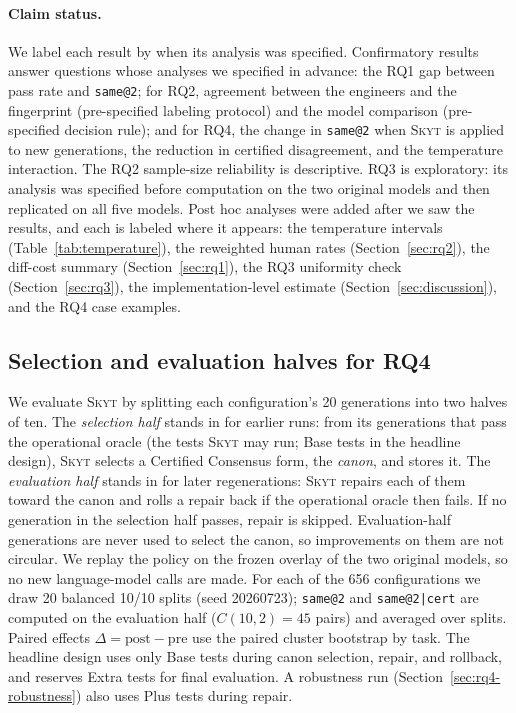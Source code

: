 \documentclass[acmsmall,screen,review,anonymous]{acmart}
\makeatletter
\newcommand{\skyt}{\textsc{Skyt}}
\newcommand{\sameat}{\mbox{\texttt{same@2}}}
\newcommand{\sameatc}{\mbox{\texttt{same@2|cert}}}
\makeatother
\begin{document}
\paragraph{Claim status.}
We label each result by when its analysis was specified.
Confirmatory results answer questions whose analyses we specified in advance:
the RQ1 gap between pass rate and \sameat{};
for RQ2, agreement between the engineers and the fingerprint (pre-specified
labeling protocol) and the model comparison (pre-specified decision rule);
and for RQ4, the change in \sameat{} when \skyt{} is applied to new
generations, the reduction in certified disagreement, and the
temperature interaction.
The RQ2 sample-size reliability is descriptive.
RQ3 is exploratory: its analysis was specified before computation on the
two original models and then replicated on all five models.
Post hoc analyses were added after we saw the results, and each is labeled
where it appears: the temperature intervals (Table~\ref{tab:temperature}),
the reweighted human rates (Section~\ref{sec:rq2}), the diff-cost summary
(Section~\ref{sec:rq1}), the RQ3 uniformity check (Section~\ref{sec:rq3}),
the implementation-level estimate (Section~\ref{sec:discussion}), and the RQ4
case examples.

\subsection{Selection and evaluation halves for RQ4}
\label{sec:split-setup}
We evaluate \skyt{} by splitting each configuration's 20 generations into two
halves of ten.
The \emph{selection half} stands in for earlier runs: from its generations
that pass the operational oracle (the tests \skyt{} may run; Base tests in the
headline design), \skyt{} selects a Certified Consensus form, the
\emph{canon}, and stores it.
The \emph{evaluation half} stands in for later regenerations: \skyt{} repairs
each of them toward the canon and rolls a repair back if the operational
oracle then fails.
If no generation in the selection half passes, repair is skipped.
Evaluation-half generations are never used to select the canon, so
improvements on them are not circular.
We replay the policy on the frozen overlay of the two original models, so no
new language-model calls are made.
For each of the 656 configurations we draw 20 balanced 10/10 splits
(seed 20260723); \sameat{} and \sameatc{} are computed on the evaluation half
($C(10,2){=}45$ pairs) and averaged over splits.
Paired effects $\Delta{=}\mathrm{post}{-}\mathrm{pre}$ use the paired cluster
bootstrap by task.
The headline design uses only Base tests during canon selection, repair, and
rollback, and reserves Extra tests for final evaluation.
A robustness run (Section~\ref{sec:rq4-robustness}) also uses Plus tests
during repair.
\end{document}
